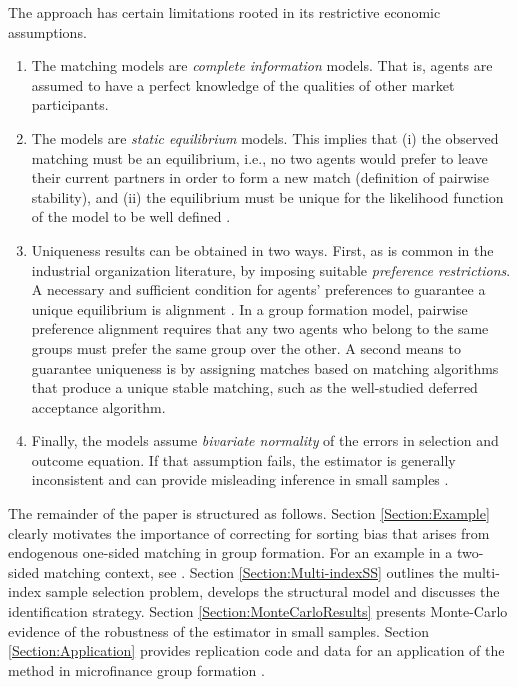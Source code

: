\begin{itemize}
The approach has certain limitations rooted in its restrictive economic assumptions. 
\begin{enumerate}
\item The matching models are \textit{complete information} models. That is, agents are assumed to have a perfect knowledge of the qualities of other market participants.
\item The models are \textit{static equilibrium} models. This implies that (i) the observed matching must be an equilibrium, i.e., no two agents would prefer to leave their current partners in order to form a new match (definition of pairwise stability), and (ii) the equilibrium must be unique for the likelihood function of the model to be well defined \citep{Bresnahan1991}.
\item Uniqueness results can be obtained in two ways. First, as is common in the industrial organization literature, by imposing suitable \textit{preference restrictions}. A necessary and sufficient condition for agents' preferences to guarantee a unique equilibrium is alignment \citep{Pycia2010}. In a group formation model, pairwise preference alignment requires that any two agents who belong to the same groups must prefer the same group over the other. A second means to guarantee uniqueness is by assigning matches based on matching algorithms that produce a unique stable matching, such as the well-studied \citet{Gale1962} deferred acceptance algorithm.
\item Finally, the models assume \textit{bivariate normality} of the errors in selection and outcome equation. If that assumption fails, the estimator is generally inconsistent and can provide misleading inference in small samples \citep{Goldberger1983}.
\end{enumerate}
\end{itemize}

\noindent The remainder of the paper is structured as follows. Section \ref{Section:Example} clearly motivates the importance of correcting for sorting bias that arises from endogenous one-sided matching in group formation. For an example in a two-sided matching context, see \citet{Sorensen2007}. Section \ref{Section:Multi-indexSS} outlines the multi-index sample selection problem, develops the structural model and discusses the identification strategy. Section \ref{Section:MonteCarloResults} presents Monte-Carlo evidence of the robustness of the estimator in small samples. Section \ref{Section:Application} provides replication code and data for an application of the method in microfinance group formation \citep[see][]{Klein2015a}. %





